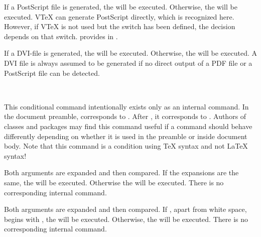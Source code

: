 \begin{Declaration}
\end{Declaration}
If a PostScript file is generated, the
 will be executed.  Otherwise, the  will be
executed. V\TeX{} can generate PostScript directly, which is recognized
here. However, if V\TeX{} is not used but the switch  has been
defined, the decision depends on that switch. \KOMAScript{} provides
 in
\hyperref[cha:typearea]{}%
.
%
\EndIndexGroup


\begin{Declaration}
\end{Declaration}
If a DVI-file is generated, the
 will be executed. Otherwise, the  will be
executed. A DVI file is always assumed to be generated if no direct output of
a PDF file or a PostScript file can be detected.%
\EndIndexGroup


\begin{Declaration}
  \ \ %
  \ \ 
\end{Declaration}
This conditional command intentionally exists only as an internal command. In
the document preamble,  corresponds to .
After , it corresponds to .
Authors of classes and packages may find this command useful if a command
should behave differently depending on whether it is used in the preamble or
inside document body. Note that this command is a
condition using \TeX{} syntax and not \LaTeX{} syntax!
%
\EndIndexGroup


\begin{Declaration}
\end{Declaration}
Both  arguments are expanded
and then compared. If the expansions are the same, the  will
be executed. Otherwise the  will be executed. There is no
corresponding internal command.
%
\EndIndexGroup


\begin{Declaration}
\end{Declaration}
Both
 arguments are expanded and then compared. If ,
apart from white space, begins with , the 
will be executed. Otherwise, the  will be executed. There is
no corresponding internal command.%
\EndIndexGroup


